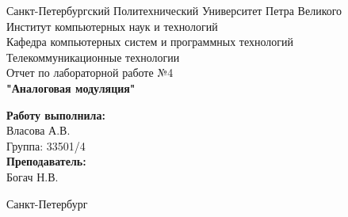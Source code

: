 \documentclass[a4paper]{article}
\begin{document}

\begin{titlepage}	%

	\begin{center}		%

		\large Санкт-Петербургский Политехнический Университет Петра Великого\\
		\large Институт компьютерных наук и технологий \\
		\large Кафедра компьютерных систем и программных технологий\\[6cm]
		
		\huge Телекоммуникационные технологии\\[0.5cm] %
		\large Отчет по лабораторной работе №4 \\[0.2cm]
		\large\textbf{"Аналоговая модуляция"}\\[5cm]

	\end{center}


	\begin{flushright} %
		\begin{minipage}{0.25\textwidth} %
			\begin{flushleft} %

				\large\textbf{Работу выполнила:}\\
				\large Власова А.В.\\
				\large {Группа:} 33501/4\\
				
				\large \textbf{Преподаватель:}\\
				\large Богач Н.В.\

			\end{flushleft}
		\end{minipage}
	\end{flushright}
	
	\vfill %

	\begin{center}
	\large Санкт-Петербург\\
	\large \the\year %
	\end{center} %

\thispagestyle{empty} %
\end{titlepage} %
\end{document}
